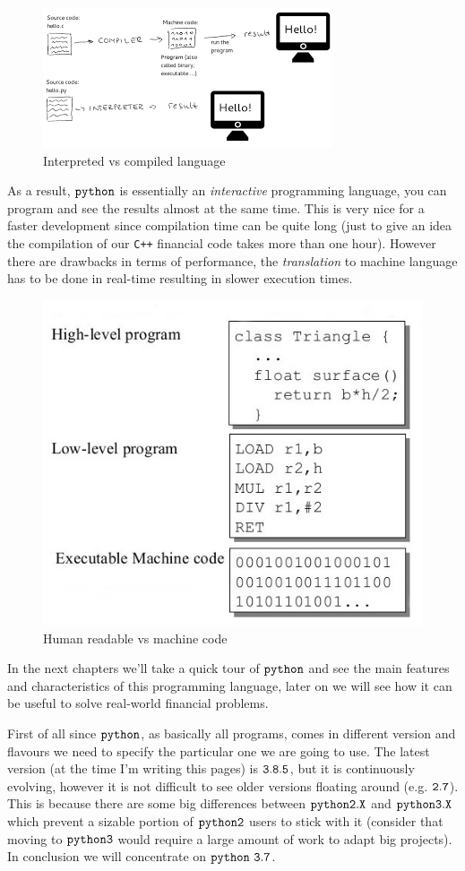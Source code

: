 \begin{figure}[h]
\centering
\includegraphics[width=0.7\linewidth]{index.png}
\caption{Interpreted vs compiled language}
\end{figure}

As a result, \(\tt{python}\) is essentially an \emph{interactive} programming language, you can program and see the results almost at the same time. This is very nice for a faster development since compilation time can be quite long (just to give an idea the compilation of our \texttt{C++} financial code takes more than one hour).
However there are drawbacks in terms of performance, the \emph{translation} to machine language has to be done in real-time resulting in slower execution times.

\begin{figure}[h]
\centering
\includegraphics[width=0.5\linewidth]{machine_language.jpeg}
\caption{Human readable vs machine code}
\end{figure}

In the next chapters we'll take a quick tour of $\tt{python}$ and see the main features and characteristics of this programming language, later on we will see how it can be useful to solve real-world financial problems.

First of all since $\tt{python}$, as basically all programs, comes in different version and flavours we need to specify the particular one we are going to use.
The latest version (at the time I'm writing this pages) is \(\tt{3.8.5}\), but it is continuously evolving, however it is not difficult to see older versions floating around (e.g. \(\tt{2.7}\)).
This is because there are some big differences between \(\tt{python 2.X}\) and \(\tt{python 3.X}\) which prevent a sizable portion of \(\tt{python 2}\) users to stick with it (consider that moving to \(\tt{python 3}\) would require a large amount of work to adapt big projects).
In conclusion we will concentrate on \textbf{\(\tt{python~3.7}\)}.

